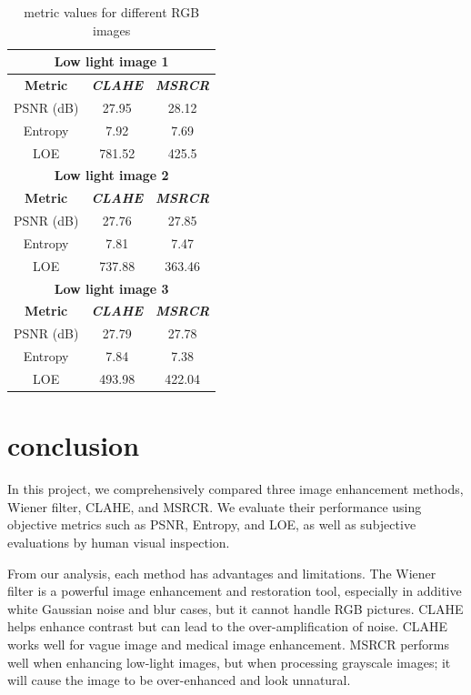 \documentclass[conference]{IEEEtran}
\begin{document}
\begin{table}[htbp]
\caption{metric values for different RGB images}
\begin{center}
\begin{tabular}{|c|c|c|}
\hline
\multicolumn{3}{|c|}{\textbf{Low light image 1}} \\
\hline
\textbf{Metric} &  \textbf{\textit{CLAHE}}&\textbf{\textit{MSRCR}} \\
\hline
PSNR (dB)& 27.95& 28.12 \\
\hline
Entropy & 7.92 & 7.69 \\
\hline
LOE & 781.52 & 425.5 \\
\hline
\multicolumn{3}{|c|}{\textbf{Low light image 2}} \\
\hline
\textbf{Metric} &  \textbf{\textit{CLAHE}}&\textbf{\textit{MSRCR}} \\
\hline
PSNR (dB)& 27.76& 27.85 \\
\hline
Entropy & 7.81 & 7.47 \\
\hline
LOE & 737.88 & 363.46 \\
\hline
\multicolumn{3}{|c|}{\textbf{Low light image 3}} \\
\hline
\textbf{Metric} &  \textbf{\textit{CLAHE}}&\textbf{\textit{MSRCR}} \\
\hline
PSNR (dB)& 27.79& 27.78 \\
\hline
Entropy & 7.84 & 7.38 \\
\hline
LOE & 493.98 & 422.04 \\
\hline
\end{tabular}
\label{tab2}
\end{center}
\end{table}


\section{conclusion}
In this project, we comprehensively compared three image enhancement methods, Wiener filter, CLAHE, and MSRCR. We evaluate their performance using objective metrics such as PSNR, Entropy, and LOE, as well as subjective evaluations by human visual inspection.

From our analysis, each method has advantages and limitations. The Wiener filter is a powerful image enhancement and restoration tool, especially in additive white Gaussian noise and blur cases, but it cannot handle RGB pictures. CLAHE helps enhance contrast but can lead to the over-amplification of noise. CLAHE works well for vague image and medical image enhancement. MSRCR performs well when enhancing low-light images, but when processing grayscale images; it will cause the image to be over-enhanced and look unnatural.
\end{document}
